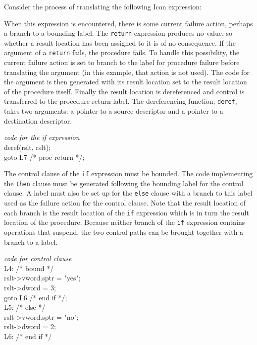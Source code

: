 Consider the process of translating the following Icon expression: 


\noindent
When this expression is encountered, there is some current failure
action, perhaps a branch to a bounding label. The \texttt{return}
expression produces no value, so whether a result location has been
assigned to it is of no consequence. If the argument of a
\texttt{return} fails, the procedure fails. To handle this
possibility, the current failure action is set to branch to the label
for procedure failure before translating the argument (in this
example, that action is not used).  The code for the argument is then
generated with its result location set to the result location of the
procedure itself. Finally the result location is dereferenced and
control is transferred to the procedure return label. The
dereferencing function, \texttt{deref}, takes two arguments: a pointer
to a source descriptor and a pointer to a destination descriptor.

\goodbreak
\begin{iconcode}
\>\>\textit{code for the if expression }\\
\>\>deref(rslt, rslt);\\
\>\>goto L7 /* proc return */;\\
\end{iconcode}


The control clause of the \texttt{if} expression must be bounded. The
code implementing the \texttt{then} clause must be generated following
the bounding label for the control clause. A label must also be set up
for the \texttt{else} clause with a branch to this label used as the
failure action for the control clause. Note that the result location
of each branch is the result location of the \texttt{if} expression
which is in turn the result location of the procedure. Because neither
branch of the \texttt{if} expression contains operations that suspend,
the two control paths can be brought together with a branch to a
label.

\goodbreak
\begin{iconcode}
\>\>\textit{code for control clause}\\
\>L4: /* bound */\\
\>\>rslt->vword.sptr = "yes";\\
\>\>rslt->dword = 3;\\
\>\>goto L6 /* end if */;\\
\>L5: /* else */\\
\>\>rslt->vword.sptr = "no";\\
\>\>rslt->dword = 2;\\
\>L6: /* end if */\\
\end{iconcode}

